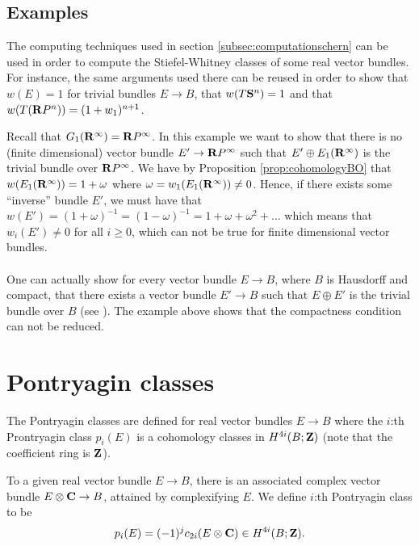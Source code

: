 \documentclass[a4paper,openany]{scrbook}
\begin{document}
\subsection{Examples}
The computing techniques used in section \ref{subsec:computationschern} can be used in order to compute the Stiefel-Whitney classes of some real vector bundles. For instance, the same arguments used there can be reused in order to show that $w(E)=1$ for trivial bundles $E\to B$, that $w(T\S^n)=1$ and that $w(T(\R P^n))=(1+w_1)^{n+1}$.
\begin{example} Recall that $G_1(\R^\infty)=\R P^\infty$.
In this example we want to show that there is no (finite dimensional) vector bundle $E'\to\R P^\infty$ such that $E'\oplus E_1(\R^\infty)$ is the trivial bundle over $\R P^\infty$. We have by Proposition \ref{prop:cohomologyBO} that $w(E_1(\R^\infty))= 1+\omega$ where $\omega = w_1(E_1(\R^\infty))\neq 0$. Hence, if there exists some ``inverse'' bundle $E'$, we must have that $w(E')=(1+\omega)^{-1} = (1-\omega)^{-1} = 1+\omega+\omega^2+\dots$ which means that $w_i(E')\neq 0$ for all $i\geq 0$, which can not be true for finite dimensional vector bundles.
\\\\
One can actually show  for every vector bundle $E\to B$, where $B$ is Hausdorff and compact, that there exists a vector bundle $E'\to B$ such that $E\oplus E'$ is the trivial bundle over $B$ (see \cite[Proposition 1.4.]{hatcher:K-theory}). The example above shows that the compactness condition can not be reduced.
\end{example}







\section{Pontryagin classes} The Pontryagin classes are defined for real vector bundles $E\to B$ where the $i$:th Prontryagin class $p_i(E)$ is a cohomology classes in $H^{4i}(B;\Z)$ (note that the coefficient ring is $\Z$).

To a given real vector bundle $E\to B$, there is an associated complex vector bundle $E\otimes \CC\to B$, attained by complexifying $E$. We define $i$:th  Pontryagin class to be 
$$p_i(E)= (-1)^jc_{2i}(E\otimes \CC)\in H^{4i}(B;\Z).$$
\end{document}
